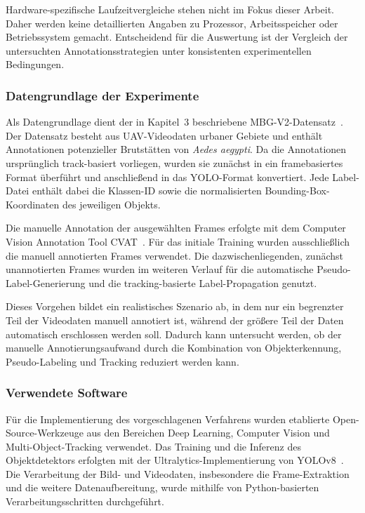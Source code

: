 Hardware-spezifische Laufzeitvergleiche stehen nicht im Fokus dieser Arbeit. Daher werden keine detaillierten Angaben zu Prozessor, Arbeitsspeicher oder Betriebssystem gemacht. Entscheidend für die Auswertung ist der Vergleich der untersuchten Annotationsstrategien unter konsistenten experimentellen Bedingungen.

\subsubsection{Datengrundlage der Experimente}

Als Datengrundlage dient der in Kapitel~3 beschriebene MBG-V2-Datensatz~\cite{passos2024mbgv2}. Der Datensatz besteht aus UAV-Videodaten urbaner Gebiete und enthält Annotationen potenzieller Brutstätten von \textit{Aedes aegypti}. Da die Annotationen ursprünglich track-basiert vorliegen, wurden sie zunächst in ein framebasiertes Format überführt und anschließend in das YOLO-Format konvertiert. Jede Label-Datei enthält dabei die Klassen-ID sowie die normalisierten Bounding-Box-Koordinaten des jeweiligen Objekts.

Die manuelle Annotation der ausgewählten Frames erfolgte mit dem Computer Vision Annotation Tool CVAT~\cite{cvat2024}. Für das initiale Training wurden ausschließlich die manuell annotierten Frames verwendet. Die dazwischenliegenden, zunächst unannotierten Frames wurden im weiteren Verlauf für die automatische Pseudo-Label-Generierung und die tracking-basierte Label-Propagation genutzt.

Dieses Vorgehen bildet ein realistisches Szenario ab, in dem nur ein begrenzter Teil der Videodaten manuell annotiert ist, während der größere Teil der Daten automatisch erschlossen werden soll. Dadurch kann untersucht werden, ob der manuelle Annotierungsaufwand durch die Kombination von Objekterkennung, Pseudo-Labeling und Tracking reduziert werden kann.

\subsubsection{Verwendete Software}

Für die Implementierung des vorgeschlagenen Verfahrens wurden etablierte Open-Source-Werkzeuge aus den Bereichen Deep Learning, Computer Vision und Multi-Object-Tracking verwendet. Das Training und die Inferenz des Objektdetektors erfolgten mit der Ultralytics-Implementierung von YOLOv8~\cite{Ultralytics2023}. Die Verarbeitung der Bild- und Videodaten, insbesondere die Frame-Extraktion und die weitere Datenaufbereitung, wurde mithilfe von Python-basierten Verarbeitungsschritten durchgeführt.

